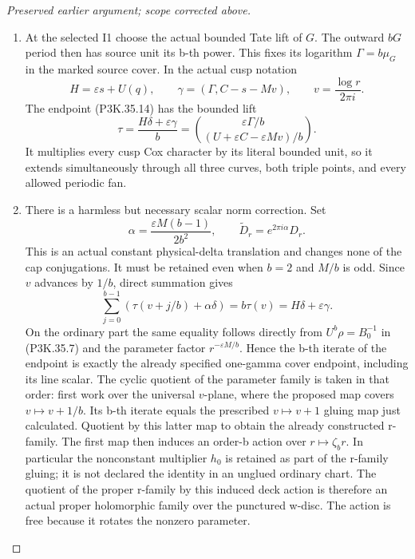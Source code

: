 \begin{proof}[Preserved earlier argument; scope corrected above]
\begin{enumerate}[label=\arabic*.]
\item At the selected I1 choose the actual bounded Tate lift of \(G\).
The outward \(bG\) period then has source unit its b-th power.
This fixes its logarithm \(\Gamma=b\mu_G\) in the marked source
cover. In the actual cusp notation
\[
 H=\varepsilon s+U(q),\qquad
 \gamma=(\Gamma,C-s-Mv),\qquad v=\frac{\log r}{2\pi i}.
\]
The endpoint (P3K.35.14) has the bounded lift
\[
       \tau=\frac{H\delta+\varepsilon\gamma}{b}
          =\binom{\varepsilon\Gamma/b}
                  {(U+\varepsilon C-\varepsilon Mv)/b}.
                                                               \tag{P3K.35.17}
\]
It multiplies every cusp Cox character by its literal bounded
unit, so it extends simultaneously through all three curves,
both triple points, and every allowed periodic fan.

\item There is a harmless but necessary scalar norm correction. Set
\[
 \alpha=\frac{\varepsilon M(b-1)}{2b^2},\qquad
 \widetilde D_r=e^{2\pi i\alpha}D_r.
                                                               \tag{P3K.35.18}
\]
This is an actual constant physical-delta translation and changes
none of the cap conjugations. It must be retained even when
\(b=2\) and \(M/b\) is odd. Since \(v\) advances by \(1/b\),
direct summation gives
\[
 \sum_{j=0}^{b-1}(\tau(v+j/b)+\alpha\delta)
                         =b\tau(v)=H\delta+\varepsilon\gamma.
                                                               \tag{P3K.35.19}
\]
On the ordinary part the same equality follows directly from
\(U^b\rho=B_0^{-1}\) in (P3K.35.7) and the parameter factor
\(r^{-\varepsilon M/b}\). Hence the b-th iterate of the
endpoint is exactly the already specified one-gamma cover
endpoint, including its line scalar. The cyclic quotient of the
parameter family is taken in that order: first work over the
universal \(v\)-plane, where the proposed map covers
\(v\mapsto v+1/b\). Its b-th iterate equals the prescribed
\(v\mapsto v+1\) gluing map just calculated. Quotient by this
latter map to obtain the already constructed r-family. The first
map then induces an order-b action over \(r\mapsto\zeta_b r\).
In particular the nonconstant multiplier \(h_0\) is retained
as part of the r-family gluing; it is not declared the identity
in an unglued ordinary chart. The quotient of the
proper r-family by this induced deck action is therefore an actual
proper holomorphic family over the punctured w-disc. The action
is free because it rotates the nonzero parameter.


\end{enumerate}
\end{proof}
